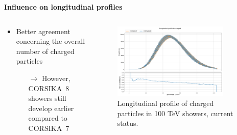 \documentclass[aspectratio=1610, 9pt]{beamer}
\begin{document}
\begin{frame}

  \textbf{Influence on longitudinal profiles}
  \vspace{5mm}

    \begin{columns}[onlytextwidth]
        \begin{column}{0.4\textwidth}
            \begin{itemize}
              \item Better agreement concerning the overall number of charged particles
              \begin{itemize}
                \item[$\rightarrow$] However, CORSIKA~8 showers still develop earlier compared to CORSIKA~7 
              \end{itemize}
            \end{itemize}
        \end{column}
        \begin{column}{0.6\textwidth}
            \begin{figure}
                \centering
                \includegraphics[width=0.85\textwidth]{plots/long_charged_2023.png}
                \caption{Longitudinal profile of charged particles in 100 \si{\tera\electronvolt} showers, current status.}
            \end{figure}
        \end{column}
    \end{columns}
\end{frame}
\end{document}
